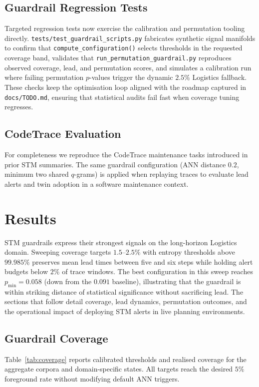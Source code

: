 \documentclass[11pt]{article}
\begin{document}
\subsection{Guardrail Regression Tests}
Targeted regression tests now exercise the calibration and permutation tooling
directly. \texttt{tests/test\_guardrail\_scripts.py} fabricates synthetic signal
manifolds to confirm that \texttt{compute\_configuration()} selects thresholds in
the requested coverage band, validates that
\texttt{run\_permutation\_guardrail.py} reproduces observed coverage, lead, and
permutation scores, and simulates a calibration run where failing
permutation $p$-values trigger the dynamic $2.5\%$ Logistics fallback. These
checks keep the optimisation loop aligned with the roadmap captured in
\texttt{docs/TODO.md}, ensuring that statistical audits fail fast when coverage
tuning regresses.

\subsection{CodeTrace Evaluation}
For completeness we reproduce the CodeTrace maintenance tasks introduced in
prior STM summaries. The same guardrail configuration (ANN distance $0.2$,
minimum two shared $q$-grams) is applied when replaying traces to evaluate lead
alerts and twin adoption in a software maintenance context.

\section{Results}
STM guardrails express their strongest signals on the long-horizon Logistics
domain. Sweeping coverage targets $1.5$--$2.5\%$ with entropy thresholds above
$99.985\%$ preserves mean lead times between five and six steps while holding alert
budgets below $2\%$ of trace windows. The best configuration in this sweep reaches
$p_{\min}=0.058$ (down from the $0.091$ baseline), illustrating that the guardrail is
within striking distance of statistical significance without sacrificing lead. The
sections that follow detail coverage, lead dynamics, permutation outcomes, and the
operational impact of deploying STM alerts in live planning environments.

\subsection{Guardrail Coverage}
Table~\ref{tab:coverage} reports calibrated thresholds and realised coverage for
the aggregate corpora and domain-specific states. All targets reach the desired
$5\%$ foreground rate without modifying default ANN triggers.
\end{document}
